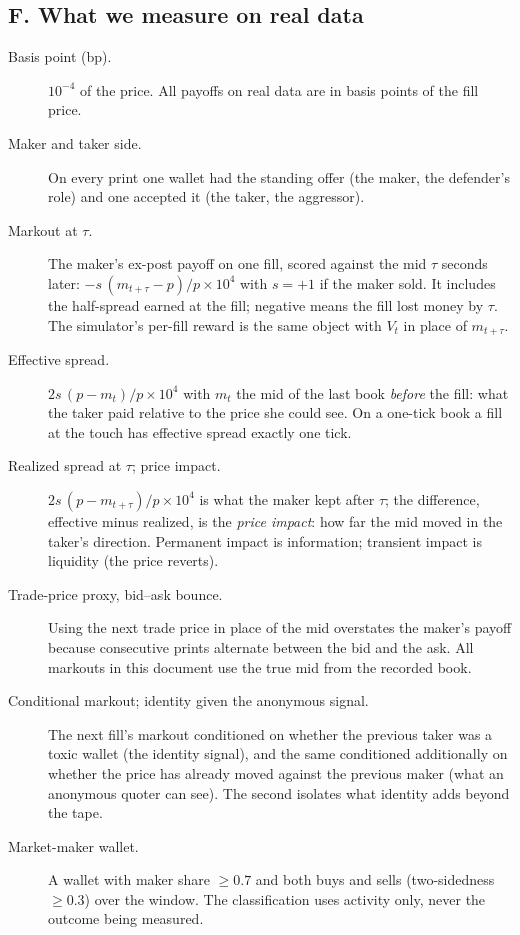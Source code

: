 \subsection*{F. What we measure on real data}
\begin{description}
\item[Basis point (bp).] $10^{-4}$ of the price. All payoffs on real data are in basis points of the fill price.
\item[Maker and taker side.] On every print one wallet had the standing offer (the maker, the defender's role) and one accepted it (the taker, the aggressor).
\item[Markout at $\tau$.] The maker's ex-post payoff on one fill, scored against the mid $\tau$ seconds later: $-s\,(m_{t+\tau}-p)/p\times10^4$ with $s=+1$ if the maker sold. It includes the half-spread earned at the fill; negative means the fill lost money by $\tau$. The simulator's per-fill reward is the same object with $V_t$ in place of $m_{t+\tau}$.
\item[Effective spread.] $2s\,(p-m_t)/p\times10^4$ with $m_t$ the mid of the last book \emph{before} the fill: what the taker paid relative to the price she could see. On a one-tick book a fill at the touch has effective spread exactly one tick.
\item[Realized spread at $\tau$; price impact.] $2s\,(p-m_{t+\tau})/p\times10^4$ is what the maker kept after $\tau$; the difference, effective minus realized, is the \emph{price impact}: how far the mid moved in the taker's direction. Permanent impact is information; transient impact is liquidity (the price reverts).
\item[Trade-price proxy, bid--ask bounce.] Using the next trade price in place of the mid overstates the maker's payoff because consecutive prints alternate between the bid and the ask. All markouts in this document use the true mid from the recorded book.
\item[Conditional markout; identity given the anonymous signal.] The next fill's markout conditioned on whether the previous taker was a toxic wallet (the identity signal), and the same conditioned additionally on whether the price has already moved against the previous maker (what an anonymous quoter can see). The second isolates what identity adds beyond the tape.
\item[Market-maker wallet.] A wallet with maker share $\ge0.7$ and both buys and sells (two-sidedness $\ge0.3$) over the window. The classification uses activity only, never the outcome being measured.
\end{description}

